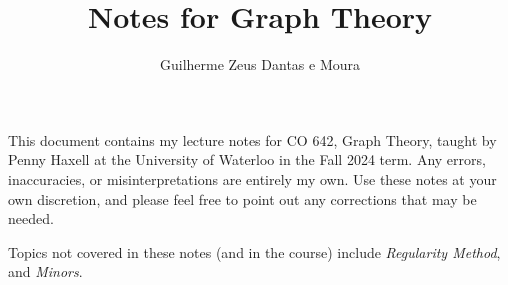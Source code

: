 \documentclass{scrbook}
\title{Notes for Graph Theory}
\author{Guilherme Zeus Dantas e Moura}
\theoremstyle{definition}
\begin{document}
	\maketitle

    This document contains my lecture notes for CO 642, Graph Theory, taught by Penny Haxell at the University of Waterloo in the Fall 2024 term.
    Any errors, inaccuracies, or misinterpretations are entirely my own.
    Use these notes at your own discretion, and please feel free to point out any corrections that may be needed.
    
    Topics not covered in these notes (and in the course) include \emph{Regularity Method}, and \emph{Minors}.
    
    \tableofcontents

    
    
    

    \printbibliography
\end{document}
